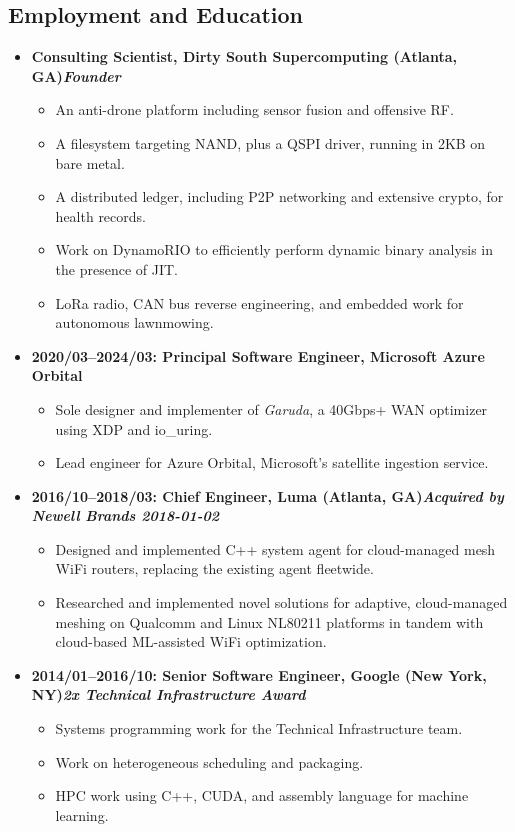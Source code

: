 \documentclass{article}
\newenvironment{tightitemize}
{\begin{itemize}
  \setlength{\itemsep}{1pt}
  \setlength{\parskip}{0pt}
  \setlength{\parsep}{0pt}}
{\end{itemize}}
\begin{document}
\vspace{2mm}
\subsection*{Employment and Education}
\begin{tightitemize}
\item \textbf{Consulting Scientist, Dirty South Supercomputing (Atlanta, GA)\hfill \tiny{\textit{Founder}}}
\begin{tightitemize}
\item An anti-drone platform including sensor fusion and offensive RF.
\item A filesystem targeting NAND, plus a QSPI driver, running in 2KB on bare metal.
\item A distributed ledger, including P2P networking and extensive crypto, for health records.
\item Work on DynamoRIO to efficiently perform dynamic binary analysis in the presence of JIT.
\item LoRa radio, CAN bus reverse engineering, and embedded work for autonomous lawnmowing.
\end{tightitemize}

  \item \textbf{2020/03--2024/03: Principal Software Engineer, Microsoft Azure Orbital}
\begin {tightitemize}
\item Sole designer and implementer of \textit{Garuda}, a 40Gbps+ WAN optimizer using XDP and io\_uring.
\item Lead engineer for Azure Orbital, Microsoft's satellite ingestion service.
\end{tightitemize}

\item \textbf{2016/10--2018/03: Chief Engineer, Luma (Atlanta, GA)\hfill \tiny{\textit{Acquired by Newell Brands 2018-01-02}}}
\begin{tightitemize}
\item Designed and implemented C++ system agent for cloud-managed mesh
	WiFi routers, replacing the existing agent fleetwide.
\item Researched and implemented novel solutions for adaptive, cloud-managed
	meshing on Qualcomm and Linux NL80211 platforms in tandem with
	cloud-based ML-assisted WiFi optimization.
\end{tightitemize}

\item \textbf{2014/01--2016/10: Senior Software Engineer, Google (New York, NY)\hfill \tiny{\textit{2x Technical Infrastructure Award}}}
\begin{tightitemize}
\item Systems programming work for the Technical Infrastructure team.
\item Work on heterogeneous scheduling and packaging.
\item HPC work using C++, CUDA, and assembly language for machine learning.
\end{tightitemize}


\end{tightitemize}
\end{document}
